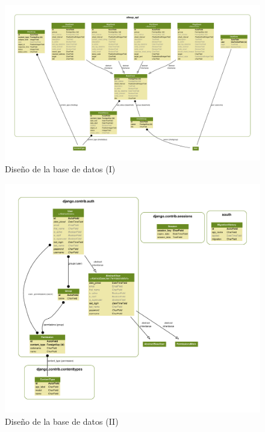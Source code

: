 \begin{figure}[p]
  \vspace{-1.5cm}
  \hspace*{-2cm}%

  \begin{minipage}{1.0\linewidth+2cm}
  \includegraphics[angle=90, width=1.0\textwidth]{5_diseno/diagrama-modelos-1}
  \caption{Diseño de la base de datos (I)}    
  \label{fig:diagrama-modelos}
  \end{minipage}
  \hspace*{-1cm}%
\end{figure}

\begin{figure}[p]
  \vspace{-1.5cm}
  \hspace*{-2cm}%

  \begin{minipage}{1.0\linewidth+2cm}
  \includegraphics[angle=90, width=1.0\textwidth]{5_diseno/diagrama-modelos-2}
  \caption{Diseño de la base de datos (II)}    
  \label{fig:diagrama-modelos-2}
  \end{minipage}
  \hspace*{-1cm}%
\end{figure}

